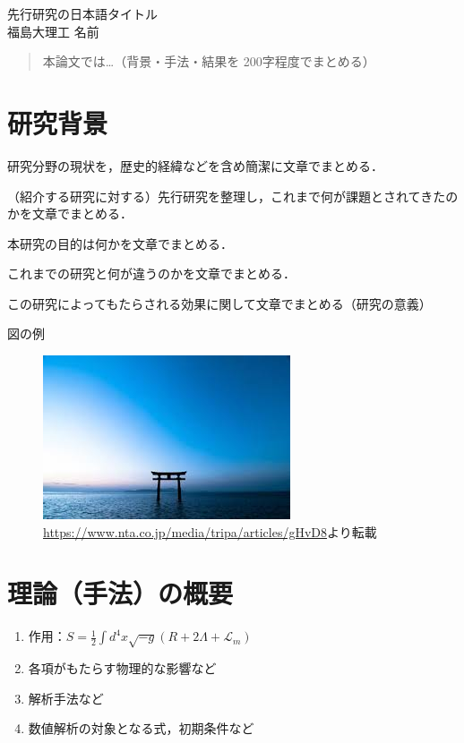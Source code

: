 \documentclass[12pt,a4paper]{jsarticle}
\begin{document}
\vspace{-5pt}
\begin{center}
{\gt \Large 先行研究の日本語タイトル\cite{G_ng_r_2021} }\\[14pt]

{\gt \large 福島大理工 名前}\\[5pt]

\end{center}

\vspace{10pt}

\begin{abstract}
    本論文では…（背景・手法・結果を 200字程度でまとめる）
\end{abstract}

\section{研究背景}
\begin{description}[leftmargin=*]
    \item[分野の状況] 研究分野の現状を，歴史的経緯などを含め簡潔に文章でまとめる．
    \item[分野の課題]（紹介する研究に対する）先行研究を整理し，これまで何が課題とされてきたのかを文章でまとめる．
    \item[研究の目的] 本研究の目的は何かを文章でまとめる．
    \item[新規性] これまでの研究と何が違うのかを文章でまとめる．
    \item[期待される効果] この研究によってもたらされる効果に関して文章でまとめる（研究の意義）
\end{description}
図の例
\begin{figure}[htbp]
    \centering
    \label{fig:research_goal}
    \includegraphics[width=0.5\linewidth]{./images/fig_1.png}
    \caption[転載元サイト]{\url{https://www.nta.co.jp/media/tripa/articles/gHvD8}より転載}
\end{figure}

\section{理論（手法）の概要}
\begin{enumerate}[leftmargin=*]
  \item 作用：$S = \frac{1}{2} \int d^4 x \sqrt{-g} \left( R + 2\Lambda + \mathcal{L}_m \right)$
  \item 各項がもたらす物理的な影響など
  \item 解析手法など
  \item 数値解析の対象となる式，初期条件など
\end{enumerate}
\end{document}
